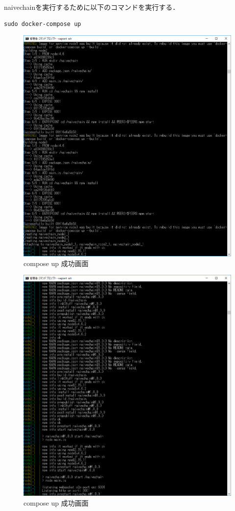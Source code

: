 naivechainを実行するために以下のコマンドを実行する．
\begin{verbatim}
sudo docker-compose up
\end{verbatim}



\begin{figure}[h]
\centering
\includegraphics[width=12cm]{composeup.PNG}
\caption{compose up 成功画面}\label{サンプル図}
\end{figure}

\newpage

\begin{figure}[h]
\centering
\includegraphics[width=12cm]{composeup2.PNG}
\caption{compose up 成功画面}\label{サンプル図}
\end{figure}



